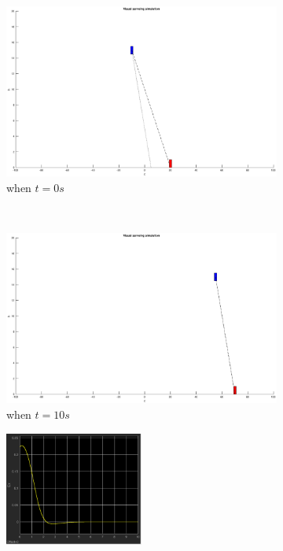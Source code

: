 \begin{figure}
	\centering
	\begin{subfigure}[b]{0.45\linewidth}
		\includegraphics[width=\textwidth]{images/chapter4/simple_zero}
		\caption{when $t=0s$}
	\end{subfigure}
	~ %
	\begin{subfigure}[b]{0.45\linewidth}
		\includegraphics[width=\textwidth]{images/chapter4/simple_ten}
		\caption{when $t=10s$}
	\end{subfigure}
	\begin{subfigure}[b]{0.8\linewidth}
		\centering
		\includegraphics[width=0.5\textwidth]{images/chapter4/simple_ex}

\end{subfigure}
\end{figure}
